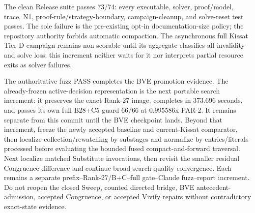 \documentclass[11pt]{article}
\begin{document}
The clean Release suite passes 73/74: every executable, solver, proof/model,
trace, N1, proof-rule/strategy-boundary, campaign-cleanup, and solve-reset test
passes.  The sole failure is the pre-existing opt-in documentation-size policy;
the repository authority forbids automatic compaction.  The asynchronous full
Kissat Tier-D campaign remains non-scorable until its aggregate classifies all
invalidity and solve loss; this increment neither waits for it nor interprets
partial resource exits as solver failures.

The authoritative fuzz PASS completes the BVE promotion evidence.  The
already-frozen active-decision representation is the next
portable search increment: it preserves the exact Rank-27 image, completes in
373.696 seconds, and passes its own full B28+C5 guard 66/66 at 0.995586x PAR-2.
It remains separate from this commit until the BVE checkpoint lands.  Beyond
that increment, freeze the newly accepted baseline and current-Kissat
comparator, then localize collection/rewatching by substages and normalize by
entries/literals processed before evaluating the bounded fused
compact-and-forward traversal.  Next localize matched Substitute invocations,
then revisit the smaller residual Congruence difference and continue broad
search-quality convergence.  Each remains a separate prefix--Rank-27/B+C--full
gate--Claude fuzz--report increment.  Do not reopen the closed Sweep, counted
directed bridge, BVE antecedent-admission, accepted Congruence, or accepted
Vivify repairs without contradictory exact-state evidence.
\end{document}
